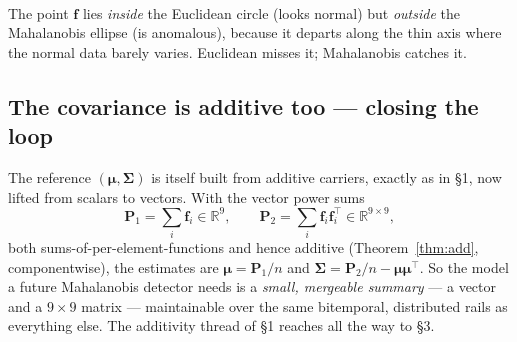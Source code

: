 \documentclass[11pt]{article}
\theoremstyle{definition}
\newcommand{\R}{\mathbb{R}}
\newcommand{\fvec}{\mathbf{f}}
\newcommand{\Cov}{\boldsymbol{\Sigma}}
\begin{document}
\begin{center}
\\[-0.1em]
{\scriptsize The point $\fvec$ lies \emph{inside} the Euclidean circle (looks normal) but
\emph{outside} the Mahalanobis ellipse (is anomalous), because it departs along the thin axis where
the normal data barely varies. Euclidean misses it; Mahalanobis catches it.}
\end{center}

\subsection{The covariance is additive too --- closing the loop}

The reference $(\boldsymbol{\mu}, \Cov)$ is itself built from additive carriers, exactly as in \S1,
now lifted from scalars to vectors. With the vector power sums
\begin{equation}
  \mathbf{P}_1 = \sum_i \fvec_i \in \R^9,
  \qquad
  \mathbf{P}_2 = \sum_i \fvec_i \fvec_i^{\top} \in \R^{9\times 9},
\end{equation}
both sums-of-per-element-functions and hence additive (Theorem~\ref{thm:add}, componentwise), the
estimates are $\boldsymbol{\mu} = \mathbf{P}_1 / n$ and
$\Cov = \mathbf{P}_2 / n - \boldsymbol{\mu}\boldsymbol{\mu}^{\top}$. So the model a future
Mahalanobis detector needs is a \emph{small, mergeable summary} --- a vector and a $9\times 9$ matrix
--- maintainable over the same bitemporal, distributed rails as everything else. The additivity
thread of \S1 reaches all the way to \S3.
\end{document}
